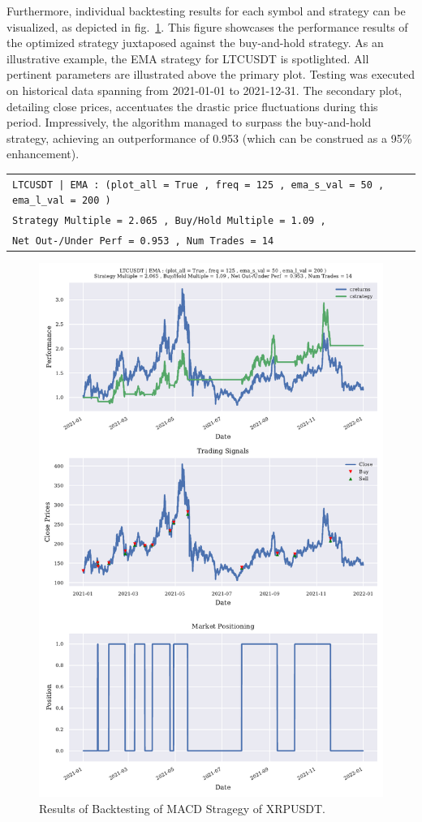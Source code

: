 Furthermore, individual backtesting results for each symbol and strategy can be visualized, as depicted in fig.~\ref{fig:backtest_results}.
This figure showcases the performance results of the optimized strategy juxtaposed against the buy-and-hold strategy.
As an illustrative example, the EMA strategy for LTCUSDT is spotlighted. All pertinent parameters are illustrated above the primary plot.
Testing was executed on historical data spanning from 2021-01-01 to 2021-12-31.
The secondary plot, detailing close prices, accentuates the drastic price fluctuations during this period.
 Impressively, the algorithm managed to surpass the buy-and-hold strategy, achieving an outperformance of 0.953 (which can be construed as a 95\% enhancement).

\begin{table}[ht!]
    \centering
    \begin{tabular}{l}
        \texttt{LTCUSDT | EMA : (plot\_all = True , freq = 125 , ema\_s\_val = 50 , ema\_l\_val = 200 )} \\
        \texttt{Strategy Multiple = 2.065 , Buy/Hold Multiple = 1.09 ,} \\
        \texttt{Net Out-/Under Perf = 0.953 , Num Trades = 14} \\
    \end{tabular}
\end{table}


\begin{figure}[ht!]
\centering
\includegraphics[page=1, trim=0mm 0mm 0 0mm, width=1\textwidth, clip]{./uml/backtesting_results.pdf}
\caption{Results of Backtesting of MACD Stragegy of XRPUSDT.}
\label{fig:backtest_results}
\end{figure}

